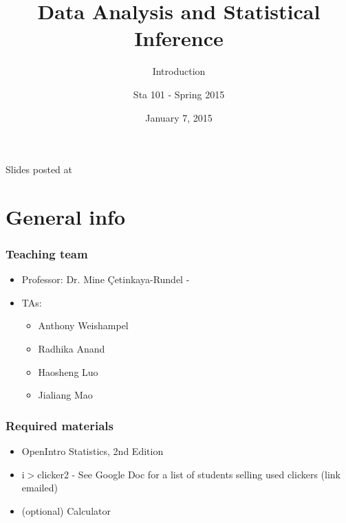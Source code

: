 \documentclass[11pt,containsverbatim,handout,xcolor=xelatex,dvipsnames,table]{beamer}
\title{Data Analysis and Statistical Inference}
\subtitle{Introduction}
\author{Sta 101 - Spring 2015}
\date{January 7, 2015}
\institute{Duke University, Department of Statistical Science}
\begin{document}



\begin{frame}[plain]

\titlepage
\vfill
{\scriptsize {} \hfill Slides posted at  }
\addtocounter{framenumber}{-1} 

\end{frame}


\section{General info}



\begin{frame}
\frametitle{Teaching team}

\begin{itemize}

\item Professor: Dr. Mine \c{C}etinkaya-Rundel - 

\item TAs:
\begin{itemize}
\item Anthony Weishampel
\item Radhika Anand
\item Haosheng Luo
\item Jialiang Mao
\end{itemize}

\end{itemize}

\end{frame}


\begin{frame}
\frametitle{Required materials}

\begin{itemize}

\item OpenIntro Statistics, 2nd Edition

\item i$>$clicker2 - See Google Doc for a list of students selling used clickers (link emailed)

\item (optional) Calculator

\end{itemize}

\end{frame}
\end{document}

